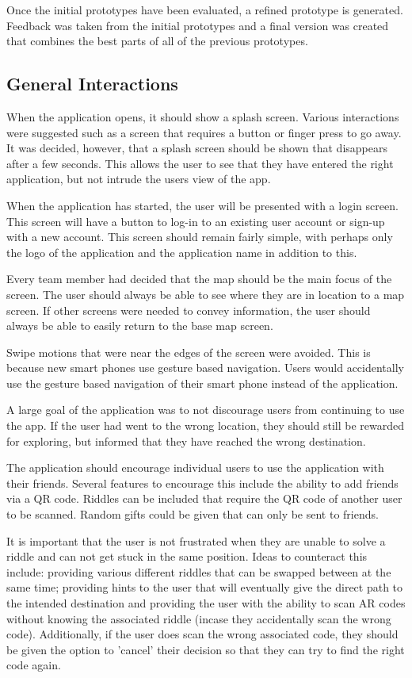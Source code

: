 \documentclass[a4,10pt,twocolumn]{article}
\begin{document}
Once the initial prototypes have been evaluated, a refined prototype is generated. Feedback was taken from the initial prototypes and a final version was created that combines the best parts of all of the previous prototypes.

\subsection*{General Interactions}
When the application opens, it should show a splash screen. Various interactions were suggested such as a screen that requires a button or finger press to go away. It was decided, however, that a splash screen should be shown that disappears after a few seconds. This allows the user to see that they have entered the right application, but not intrude the users view of the app.

When the application has started, the user will be presented with a login screen. This screen will have a button to log-in to an existing user account or sign-up with a new account. This screen should remain fairly simple, with perhaps only the logo of the application and the application name in addition to this.

Every team member had decided that the map should be the main focus of the screen. The user should always be able to see where they are in location to a map screen. If other screens were needed to convey information, the user should always be able to easily return to the base map screen.

Swipe motions that were near the edges of the screen were avoided. This is because new smart phones use gesture based navigation. Users would accidentally use the gesture based navigation of their smart phone instead of the application.

A large goal of the application was to not discourage users from continuing to use the app. If the user had went to the wrong location, they should still be rewarded for exploring, but informed that they have reached the wrong destination.

The application should encourage individual users to use the application with their friends. Several features to encourage this include the ability to add friends via a QR code. Riddles can be included that require the QR code of another user to be scanned. Random gifts could be given that can only be sent to friends.

It is important that the user is not frustrated when they are unable to solve a riddle and can not get stuck in the same position. Ideas to counteract this include: providing various different riddles that can be swapped between at the same time; providing hints to the user that will eventually give the direct path to the intended destination and providing the user with the ability to scan AR codes without knowing the associated riddle (incase they accidentally scan the wrong code). Additionally, if the user does scan the wrong associated code, they should be given the option to 'cancel' their decision so that they can try to find the right code again.
\end{document}
